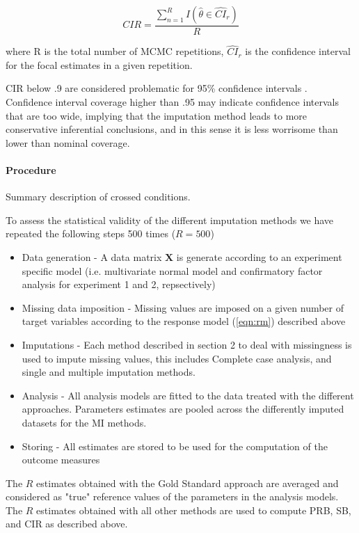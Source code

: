 	\begin{equation} \label{eqn:sb}
		CIR =  \frac{ \sum_{n=1}^{R} I(\hat{\theta} \in \widehat{CI}_r ) }{R}
	\end{equation}

	where R is the total number of MCMC repetitions, $\hat{CI}_r$ is the confidence interval for the focal estimates
	in a given repetition.

	CIR below .9 are considered problematic for 95\% confidence intervals \cite[p. 52]{vanBuuren:2018}.
	Confidence interval coverage higher than .95 may indicate confidence intervals that are too wide, implying that
	the imputation method leads to more conservative inferential conclusions, and in this sense it is less worrisome 
	than lower than nominal coverage.

\paragraph{Procedure}
	Summary description of crossed conditions.
	
	To assess the statistical validity of the different imputation methods we have repeated the following steps
	500 times ($R = 500$)

	\begin{itemize}
		\item Data generation - A data matrix $\bm{X}$ is generate according to an experiment specific model
			(i.e. multivariate normal model and confirmatory factor analysis for experiment 1 and 2, 
			repsectively)
		\item Missing data imposition - Missing values are imposed on a given number of target variables
			according to the response model (\ref{eqn:rm}) described above
		\item Imputations - Each method described in section 2 to deal with missingness is used to impute 
			missing values, this includes Complete case analysis, and single and multiple imputation 
			methods.
		\item Analysis - All analysis models are fitted to the data treated with the different approaches.
			Parameters estimates are pooled across the differently imputed datasets for the MI methods.
		\item Storing - All estimates are stored to be used for the computation of the outcome measures
	\end{itemize}

	The $R$ estimates obtained with the Gold Standard approach are averaged and considered as "true" reference
	values of the parameters in the analysis models.
	The $R$ estimates obtained with all other methods are used to compute PRB, SB, and CIR as described above.

